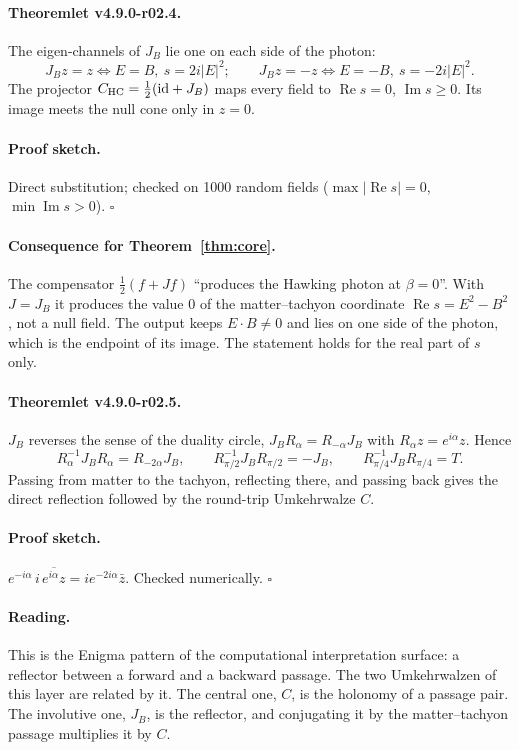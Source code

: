 \paragraph{Theoremlet v4.9.0-r02.4.}
The eigen-channels of \(J_B\) lie one on each side of the photon:
\[
J_Bz=z\iff E=B,\ s=2i|E|^2;\qquad J_Bz=-z\iff E=-B,\ s=-2i|E|^2.
\]
The projector \(C_{\mathrm{HC}}=\tfrac12(\mathrm{id}+J_B)\) maps every field to \(\operatorname{Re}s=0\),
\(\operatorname{Im}s\ge0\).  Its image meets the null cone only in \(z=0\).

\paragraph{Proof sketch.}
Direct substitution; checked on 1000 random fields (\(\max|\operatorname{Re}s|=0\), \(\min\operatorname{Im}s>0\)).
\(\square\)

\paragraph{Consequence for Theorem~\ref{thm:core}.}
The compensator \(\tfrac12(f+Jf)\) ``produces the Hawking photon at \(\beta=0\)''.  With \(J=J_B\) it produces the value
\(0\) of the matter--tachyon coordinate \(\operatorname{Re}s=E^2-B^2\), not a null field.  The output keeps
\(E\cdot B\neq0\) and lies on one side of the photon, which is the endpoint of its image.  The statement holds for the real
part of \(s\) only.

\paragraph{Theoremlet v4.9.0-r02.5.}
\(J_B\) reverses the sense of the duality circle, \(J_BR_\alpha=R_{-\alpha}J_B\) with \(R_\alpha z=e^{i\alpha}z\).  Hence
\[
R_\alpha^{-1}J_BR_\alpha=R_{-2\alpha}J_B,
\qquad
R_{\pi/2}^{-1}J_BR_{\pi/2}=-J_B,
\qquad
R_{\pi/4}^{-1}J_BR_{\pi/4}=T .
\]
Passing from matter to the tachyon, reflecting there, and passing back gives the direct reflection followed by the
round-trip Umkehrwalze \(C\).

\paragraph{Proof sketch.}
\(e^{-i\alpha}\,i\,\overline{e^{i\alpha}z}=ie^{-2i\alpha}\bar z\).  Checked numerically.  \(\square\)

\paragraph{Reading.}
This is the Enigma pattern of the computational interpretation surface: a reflector between a forward and a backward
passage.  The two Umkehrwalzen of this layer are related by it.  The central one, \(C\), is the holonomy of a passage
pair.  The involutive one, \(J_B\), is the reflector, and conjugating it by the matter--tachyon passage multiplies it by
\(C\).

